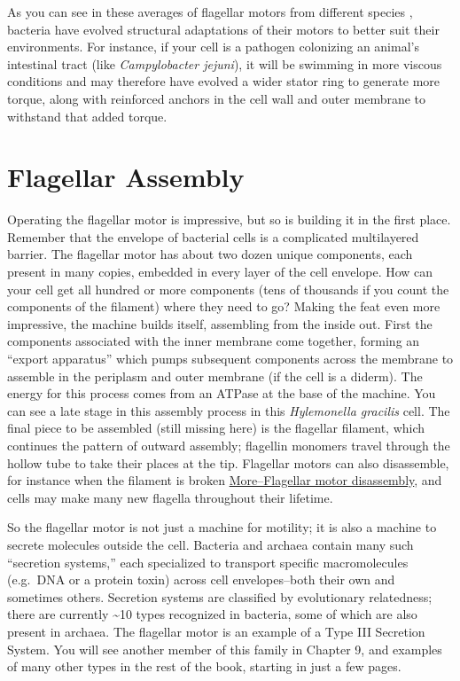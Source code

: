 \documentclass[]{tufte-book}
\begin{document}
As you can see in these averages of flagellar motors from different
species \citet{murphy2006} \citet{chen2011} \citet{zhao2014}
\citet{beeby2016} \citet{qin2017} \citet{chaban2018} \citet{kaplan2019}
\citet{ferreira2019} \citet{chang2019}, bacteria have evolved structural
adaptations of their motors to better suit their environments. For
instance, if your cell is a pathogen colonizing an animal's intestinal
tract (like \emph{Campylobacter jejuni}), it will be swimming in more
viscous conditions and may therefore have evolved a wider stator ring to
generate more torque, along with reinforced anchors in the cell wall and
outer membrane to withstand that added torque.

\section{Flagellar Assembly}\label{flagellar-assembly}

Operating the flagellar motor is impressive, but so is building it in
the first place. Remember that the envelope of bacterial cells is a
complicated multilayered barrier. The flagellar motor has about two
dozen unique components, each present in many copies, embedded in every
layer of the cell envelope. How can your cell get all hundred or more
components (tens of thousands if you count the components of the
filament) where they need to go? Making the feat even more impressive,
the machine builds itself, assembling from the inside out. First the
components associated with the inner membrane come together, forming an
``export apparatus'' which pumps subsequent components across the
membrane to assemble in the periplasm and outer membrane (if the cell is
a diderm). The energy for this process comes from an ATPase at the base
of the machine. You can see a late stage in this assembly process in
this \emph{Hylemonella gracilis} cell. The final piece to be assembled
(still missing here) is the flagellar filament, which continues the
pattern of outward assembly; flagellin monomers travel through the
hollow tube to take their places at the tip. Flagellar motors can also
disassemble, for instance when the filament is broken
\protect\hyperlink{moreflagellar-motor-disassembly}{More--Flagellar
motor disassembly}, and cells may make many new flagella throughout
their lifetime.

So the flagellar motor is not just a machine for motility; it is also a
machine to secrete molecules outside the cell. Bacteria and archaea
contain many such ``secretion systems,'' each specialized to transport
specific macromolecules (e.g.~DNA or a protein toxin) across cell
envelopes--both their own and sometimes others. Secretion systems are
classified by evolutionary relatedness; there are currently
\textasciitilde{}10 types recognized in bacteria, some of which are also
present in archaea. The flagellar motor is an example of a Type III
Secretion System. You will see another member of this family in Chapter
9, and examples of many other types in the rest of the book, starting in
just a few pages.
\end{document}
